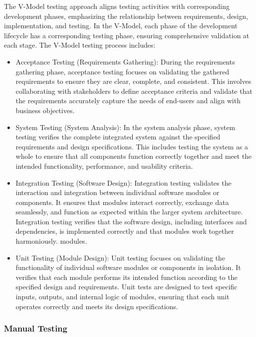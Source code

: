 		The V-Model testing approach aligns testing activities with corresponding development phases, emphasizing the relationship between requirements, design, implementation, and testing. In the V-Model, each phase of the development lifecycle has a corresponding testing phase, ensuring comprehensive validation at each stage. The V-Model testing process includes:

		\begin{itemize}
			\item Acceptance Testing (Requirements Gathering): During the requirements gathering phase, acceptance testing focuses on validating the gathered requirements to ensure they are clear, complete, and consistent. This involves collaborating with stakeholders to define acceptance criteria and validate that the requirements accurately capture the needs of end-users and align with business objectives.
			\item System Testing (System Analysis): In the system analysis phase, system testing verifies the complete integrated system against the specified requirements and design specifications. This includes testing the system as a whole to ensure that all components function correctly together and meet the intended functionality, performance, and usability criteria.
			\item Integration Testing (Software Design): Integration testing validates the interaction and integration between individual software modules or components. It ensures that modules interact correctly, exchange data seamlessly, and function as expected within the larger system architecture. Integration testing verifies that the software design, including interfaces and dependencies, is implemented correctly and that modules work together harmoniously.
			modules.
			\item Unit Testing (Module Design): Unit testing focuses on validating the functionality of individual software modules or components in isolation. It verifies that each module performs its intended function according to the specified design and requirements. Unit tests are designed to test specific inputs, outputs, and internal logic of modules, ensuring that each unit operates correctly and meets its design specifications.
		\end{itemize}

		\subsubsection{Manual Testing}
		
